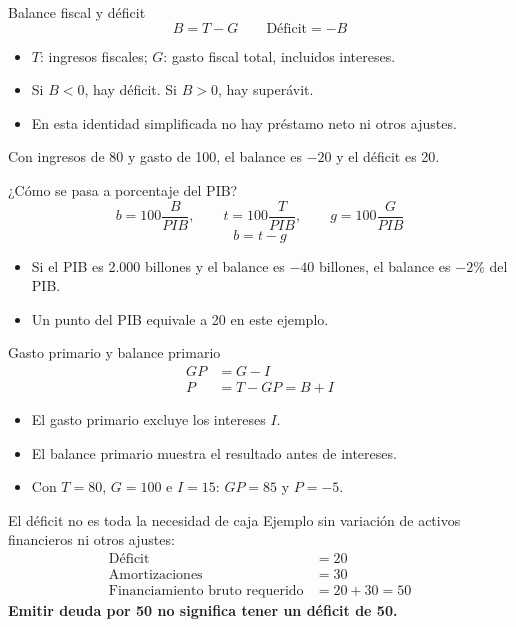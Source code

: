 \begin{frame}{Balance fiscal y déficit}
\[B=T-G \qquad \text{Déficit}=-B\]
\begin{itemize}
  \item $T$: ingresos fiscales; $G$: gasto fiscal total, incluidos intereses.
  \item Si $B<0$, hay déficit. Si $B>0$, hay superávit.
  \item En esta identidad simplificada no hay préstamo neto ni otros ajustes.
\end{itemize}
\vspace{0.6em}
Con ingresos de 80 y gasto de 100, el balance es $-20$ y el déficit es 20.
\fuenteFMI
\fuenteCaja
\end{frame}

\begin{frame}{¿Cómo se pasa a porcentaje del PIB?}
\[b=100\frac{B}{PIB},\qquad t=100\frac{T}{PIB},\qquad g=100\frac{G}{PIB}\]
\[b=t-g\]
\begin{itemize}
  \item Si el PIB es 2.000 billones y el balance es $-40$ billones, el balance es $-2\%$ del PIB.
  \item Un punto del PIB equivale a 20 en este ejemplo.
\end{itemize}
\fuenteFMI
\end{frame}

\begin{frame}{Gasto primario y balance primario}
\begin{align*}GP &=G-I\\ P &=T-GP=B+I\end{align*}
\begin{itemize}
  \item El gasto primario excluye los intereses $I$.
  \item El balance primario muestra el resultado antes de intereses.
  \item Con $T=80$, $G=100$ e $I=15$: $GP=85$ y $P=-5$.
\end{itemize}
\fuenteFMI
\end{frame}

\begin{frame}{El déficit no es toda la necesidad de caja}
Ejemplo sin variación de activos financieros ni otros ajustes:
\begin{align*}
  \text{Déficit}&=20\\
  \text{Amortizaciones}&=30\\
  \text{Financiamiento bruto requerido}&=20+30=50
\end{align*}
\textbf{Emitir deuda por 50 no significa tener un déficit de 50.}
\fuenteFMI
\end{frame}

